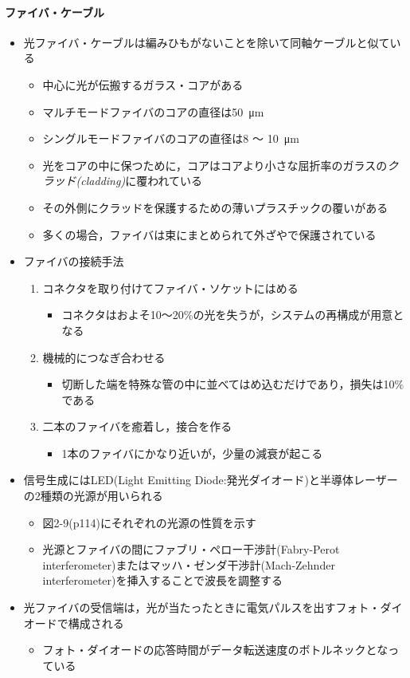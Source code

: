 \documentclass[a4paper]{ltjsarticle}
\begin{document}
			\paragraph{ファイバ・ケーブル}
				\begin{itemize}
					\item 光ファイバ・ケーブルは編みひもがないことを除いて同軸ケーブルと似ている
					\begin{itemize}
						\item 中心に光が伝搬するガラス・コアがある
						\item マルチモードファイバのコアの直径は\SI{50}{\micro m}
						\item シングルモードファイバのコアの直径は8 ～ \SI{10}{\micro m}
						\item 光をコアの中に保つために，コアはコアより小さな屈折率のガラスの\emph{クラッド(cladding)}に覆われている
						\item その外側にクラッドを保護するための薄いプラスチックの覆いがある
						\item 多くの場合，ファイバは束にまとめられて外ざやで保護されている
					\end{itemize}
					\item ファイバの接続手法
					\begin{enumerate}
						\item コネクタを取り付けてファイバ・ソケットにはめる
						\begin{itemize}
							\item コネクタはおよそ10～20\%の光を失うが，システムの再構成が用意となる
						\end{itemize}
						\item 機械的につなぎ合わせる
						\begin{itemize}
							\item 切断した端を特殊な管の中に並べてはめ込むだけであり，損失は10\%である
						\end{itemize}
						\item 二本のファイバを癒着し，接合を作る
						\begin{itemize}
							\item 1本のファイバにかなり近いが，少量の減衰が起こる
						\end{itemize}
					\end{enumerate}
					\item 信号生成にはLED(Light Emitting Diode:発光ダイオード)と半導体レーザーの2種類の光源が用いられる
					\begin{itemize}
						\item 図2-9(p114)にそれぞれの光源の性質を示す
						\item 光源とファイバの間にファブリ・ペロー干渉計(Fabry-Perot interferometer)またはマッハ・ゼンダ干渉計(Mach-Zehnder interferometer)を挿入することで波長を調整する
					\end{itemize}
					\item 光ファイバの受信端は，光が当たったときに電気パルスを出すフォト・ダイオードで構成される
					\begin{itemize}
						\item フォト・ダイオードの応答時間がデータ転送速度のボトルネックとなっている
					\end{itemize}
				\end{itemize}
\end{document}
